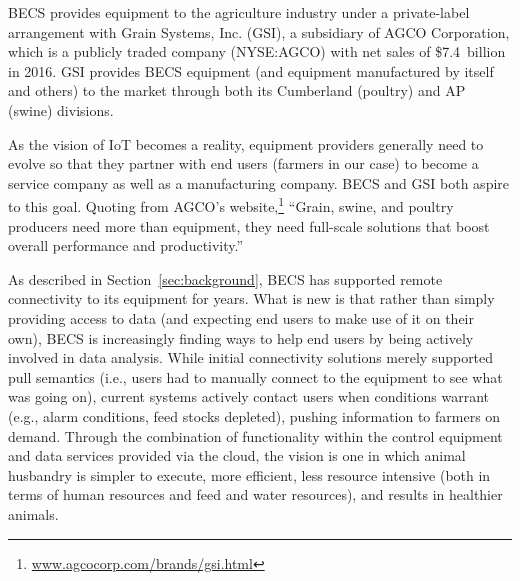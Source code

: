 BECS provides equipment to the agriculture industry under a private-label
arrangement with Grain Systems, Inc. (GSI), a subsidiary of
AGCO Corporation,
which is a publicly traded company (NYSE:AGCO) with net sales
of \$7.4~billion in 2016.
GSI provides BECS equipment (and equipment manufactured by itself and others)
to the market
through both its Cumberland (poultry) and AP (swine) divisions.

As the vision of IoT becomes a reality, equipment providers
generally need to evolve so that they partner with end users
(farmers in our case) to become a service company as well as a
manufacturing company. BECS and GSI both aspire to this goal.
Quoting from AGCO's
website,\footnote{\url{www.agcocorp.com/brands/gsi.html}}
``Grain, swine, and poultry producers need more than equipment,
they need full-scale solutions that boost overall performance
and productivity.''

As described in Section~\ref{sec:background}, BECS has supported
remote connectivity to its equipment for years.  What is new is that
rather than simply providing access to data (and expecting end users
to make use of it on their own), BECS is increasingly finding ways to
help end users by being actively involved in data analysis.
While initial connectivity solutions
merely supported pull semantics (i.e., users had to
manually connect to the equipment to
see what was going on), current systems actively contact users when
conditions warrant (e.g., alarm conditions, feed stocks depleted),
pushing information to farmers on demand.
Through the combination of functionality within the control equipment 
and data services provided via the cloud, the vision is one in
which animal husbandry is simpler to execute,
more efficient,
less resource intensive (both in terms of human resources and
feed and water resources), and results in healthier animals.

%

